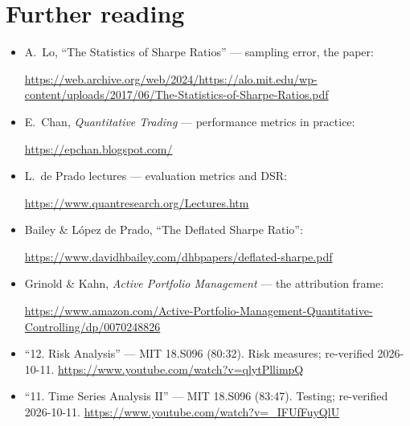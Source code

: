 \section*{Further reading}
\begin{itemize}
\item A.~Lo, ``The Statistics of Sharpe Ratios'' --- sampling error, the paper:

\url{https://web.archive.org/web/2024/https://alo.mit.edu/wp-content/uploads/2017/06/The-Statistics-of-Sharpe-Ratios.pdf}
\item E.~Chan, \emph{Quantitative Trading} --- performance metrics in practice:

\url{https://epchan.blogspot.com/}
\item L.~de Prado lectures --- evaluation metrics and DSR:

\url{https://www.quantresearch.org/Lectures.htm}
\item Bailey \& L\'opez de Prado, ``The Deflated Sharpe Ratio'':

\url{https://www.davidhbailey.com/dhbpapers/deflated-sharpe.pdf}
\item Grinold \& Kahn, \emph{Active Portfolio Management} --- the attribution frame:

\url{https://www.amazon.com/Active-Portfolio-Management-Quantitative-Controlling/dp/0070248826}
\end{itemize}

\begin{rulebox}
\begin{itemize}
\item ``12. Risk Analysis'' --- MIT 18.S096 (80:32). Risk measures; re-verified 2026-10-11.
\url{https://www.youtube.com/watch?v=qlytPllimpQ}
\item ``11. Time Series Analysis II'' --- MIT 18.S096 (83:47). Testing; re-verified
2026-10-11.
\url{https://www.youtube.com/watch?v=_IFUfFuyQlU}
\end{itemize}
\end{rulebox}

